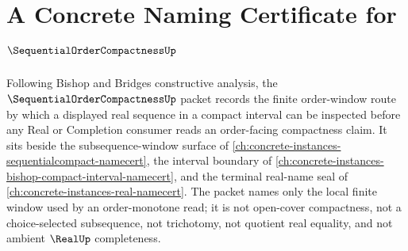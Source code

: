 \chapter{A Concrete Naming Certificate for $\SequentialOrderCompactnessUp$}
\label{ch:concrete-instances-sequential-order-compactness-namecert}

Following Bishop and Bridges constructive analysis, the $\SequentialOrderCompactnessUp$ packet records the finite order-window route by which a displayed real sequence in a compact interval can be inspected before any Real or Completion consumer reads an order-facing compactness claim. It sits beside the subsequence-window surface of \autoref{ch:concrete-instances-sequentialcompact-namecert}, the interval boundary of \autoref{ch:concrete-instances-bishop-compact-interval-namecert}, and the terminal real-name seal of \autoref{ch:concrete-instances-real-namecert}. The packet names only the local finite window used by an order-monotone read; it is not open-cover compactness, not a choice-selected subsequence, not trichotomy, not quotient real equality, and not ambient $\RealUp$ completeness.

